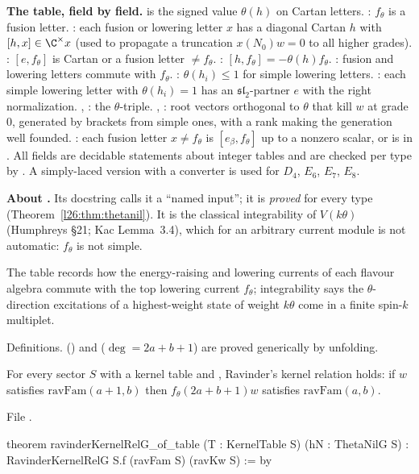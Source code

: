 \begin{dictionary}
\textbf{The table, field by field.}  is the signed value $\theta(h)$ on Cartan letters. : $f_\theta$ is a
fusion letter. : each fusion or lowering letter $x$ has a diagonal Cartan $h$ with $[h,x]\in\C^\times x$ (used to
propagate a truncation $x(N_0)w=0$ to all higher grades). : $[e,f_\theta]$ is Cartan or a fusion letter $\neq f_\theta$.
: $[h,f_\theta]=-\theta(h)f_\theta$. : fusion and lowering letters commute with $f_\theta$.
: $\theta(h_i)\le1$ for simple lowering letters. : each simple lowering letter with $\theta(h_i)=1$ has an
$\mathfrak{sl}_2$-partner $e$ with the right normalization. , : the $\theta$-triple. , : root
vectors orthogonal to $\theta$ that kill $w$ at grade $0$, generated by brackets from simple ones, with a rank making the generation
well founded. : each fusion letter $x\neq f_\theta$ is $[e_\beta,f_\theta]$ up to a nonzero scalar, or is in
. All fields are decidable statements about integer tables and are checked per type by . A
simply-laced version  with a converter  is used for $D_4$, $E_6$, $E_7$, $E_8$.

\textbf{About .} Its docstring calls it a ``named input''; it is \emph{proved} for every type
(Theorem~\ref{l26:thm:thetanil}). It is the classical integrability of $V(k\theta)$ (Humphreys \S21; Kac Lemma~3.4), which for an
arbitrary current module is not automatic: $f_\theta$ is not simple.
\end{dictionary}

\begin{physics}
The table records how the energy-raising and lowering currents of each flavour algebra commute with the top lowering current
$f_\theta$; integrability says the $\theta$-direction excitations of a highest-weight state of weight $k\theta$ come in a finite
spin-$k$ multiplet.
\end{physics}

\begin{status}
Definitions.  () and  ($\deg=2a+b+1$) are proved generically by unfolding.
\end{status}

\begin{theorem}\label{l26:thm:kernelG}
For every sector $S$ with a kernel table and , Ravinder's kernel relation holds: if $w$ satisfies
$\mathrm{ravFam}(a+1,b)$ then $f_\theta(2a+b+1)w$ satisfies $\mathrm{ravFam}(a,b)$.
\end{theorem}
\noindent File .
\begin{leancode}
theorem ravinderKernelRelG_of_table (T : KernelTable S) (hN : ThetaNilG S) :
    RavinderKernelRelG S.f (ravFam S) (ravKw S) := by
\end{leancode}

